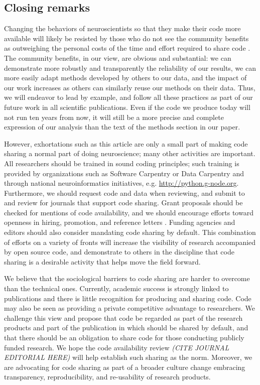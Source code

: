 \documentclass[11pt]{article}
\begin{document}
\subsection*{Closing remarks}

Changing the behaviors of neuroscientists so that they make their code more
available will likely be resisted by those who do not see the community
benefits as outweighing the personal costs of the time and effort required to
share code \cite{stodden2010scientific}. The community benefits, in our view,
are obvious and substantial: we can demonstrate more robustly and transparently
the reliability of our results, we can more easily adapt methods developed by
others to our data, and the impact of our work increases as others can
similarly reuse our methods on their data. Thus, we will endeavor to lead by
example, and follow all these practices as part of our future work in all
scientific publications. Even if the code we produce today will not run ten
years from now, it will still be a more precise and complete expression of our
analysis than the text of the methods section in our paper. 

However, exhortations such as this article are only a small part of
making code sharing a normal part of doing neuroscience; many other
activities are important.  All researchers should be trained in sound
coding principles; such training is provided by organizations such as
Software Carpentry \cite{wilson_best_2014} or Data Carpentry and
through national neuroinformatics initiatives,
e.g. \url{http://python.g-node.org}.  Furthermore, we should request
code and data when reviewing, and submit to and review for journals
that support code sharing.  Grant proposals should be checked for
mentions of code availability, and we should encourage efforts toward
openness in hiring, promotion, and reference letters
\cite{leveque2012reproducible}. Funding agencies and editors should
also consider mandating code sharing by default.  This combination of
efforts on a variety of fronts will increase the visibility of
research accompanied by open source code, and demonstrate to others in
the discipline that code sharing is a desirable activity that helps
move the field forward.

We believe that the sociological barriers to code sharing are harder
to overcome than the technical ones. Currently, academic success is
strongly linked to publications and there is little recognition for
producing and sharing code. Code may also be seen as providing a
private competitive advantage to researchers. We challenge this view
and propose that code be regarded as part of the research products and
part of the publication in which should be shared by default, and that
there should be an obligation to share code for those conducting
publicly funded research. We hope the code availability review
\textit{(CITE JOURNAL EDITORIAL HERE)} will
help establish such sharing as the norm.  Moreover, we are advocating
for code sharing as part of a broader culture change embracing
transparency, reproducibility, and re-usability of research products.
\end{document}

